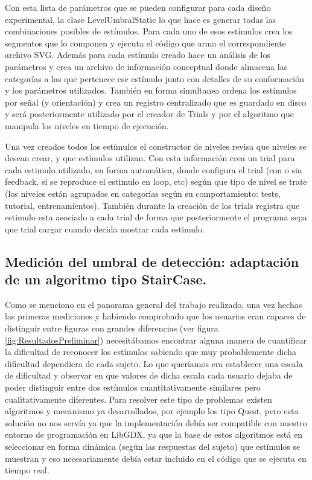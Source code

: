 \documentclass{article}
\begin{document}
    Con esta lista de parámetros que se pueden configurar para cada diseño experimental, la clase LevelUmbralStatic lo que hace es generar todas las combinaciones posibles de estímulos. Para cada uno de esos estímulos crea los segmentos que lo componen y ejecuta el código que arma el correspondiente archivo SVG. Además para cada estímulo creado hace un análisis de los parámetros y crea un archivo de información conceptual donde almacena las categorías a las que pertenece ese estímulo junto con detalles de su conformación y los parámetros utilizados. También en forma simultanea ordena los estímulos por señal (y orientación) y crea un registro centralizado que es guardado en disco y será posteriormente utilizado por el creador de Trials y por el algoritmo que manipula los niveles en tiempo de ejecución.
    
    Una vez creados todos los estímulos el constructor de niveles revisa que niveles se desean crear, y que estímulos utilizan. Con esta información crea un trial para cada estimulo utilizado, en forma automática, donde configura el trial (con o sin feedback, si se reproduce el estimulo en loop, etc) según que tipo de nivel se trate (los niveles están agrupados en categorías según su comportamiento: tests, tutorial, entrenamientos). También durante la creación de los trials registra que estimulo esta asociado a cada trial de forma que posteriormente el programa sepa que trial cargar cuando decida mostrar cada estimulo. 
    
    \subsection{Medición del umbral de detección: adaptación de un algoritmo tipo StairCase.}
    \label{seccion:staircase}
    
    Como se menciono en el panorama general del trabajo realizado, una vez hechas las primeras mediciones y habiendo comprobado que los usuarios eran capaces de distinguir entre figuras con grandes diferencias (ver figura \ref{fig:ResultadosPreliminar}) necesitábamos encontrar alguna manera de cuantificar la dificultad de reconocer los estímulos sabiendo que muy probablemente dicha dificultad dependiera de cada sujeto. Lo que queríamos era establecer una escala de dificultad y observar en que valores de dicha escala cada usuario dejaba de poder distinguir entre dos estímulos cuantitativamente similares pero cualitativamente diferentes. Para resolver este tipo de problemas existen algoritmos y mecanismo ya desarrollados, por ejemplo los tipo Quest, pero esta solución no nos servía ya que la implementación debía ser compatible con nuestro entorno de programación en LibGDX, ya que la base de estos algoritmos está en seleccionar en forma dinámica (según las respuestas del sujeto) que estímulos se muestran y eso necesariamente debía estar incluido en el código que se ejecuta en tiempo real. 
    
\end{document}
